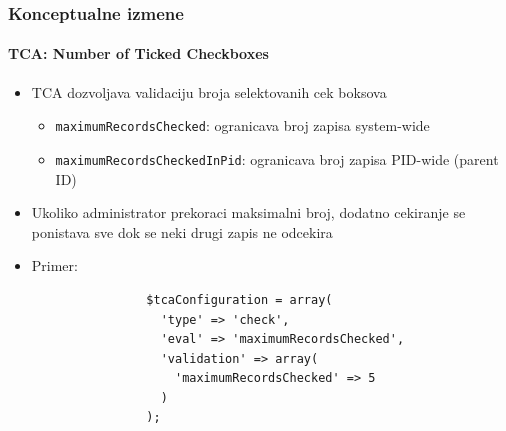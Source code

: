 \begin{frame}[fragile]
	\frametitle{Konceptualne izmene}
	\framesubtitle{TCA: Number of Ticked Checkboxes}

	\lstset{
		basicstyle=\tiny\ttfamily
	}

	\begin{itemize}
		\item TCA dozvoljava validaciju broja selektovanih cek boksova

			\begin{itemize}
				\item \texttt{maximumRecordsChecked}:\newline
					ogranicava broj zapisa system-wide
				\item \texttt{maximumRecordsCheckedInPid}:\newline
					ogranicava broj zapisa PID-wide (parent ID)
			\end{itemize}

		\item Ukoliko administrator prekoraci maksimalni broj, dodatno cekiranje se ponistava sve dok se neki drugi zapis ne odcekira

		\item Primer:

			\begin{lstlisting}
				$tcaConfiguration = array(
				  'type' => 'check',
				  'eval' => 'maximumRecordsChecked',
				  'validation' => array(
				    'maximumRecordsChecked' => 5
				  )
				);
			\end{lstlisting}

	\end{itemize}

\end{frame}


